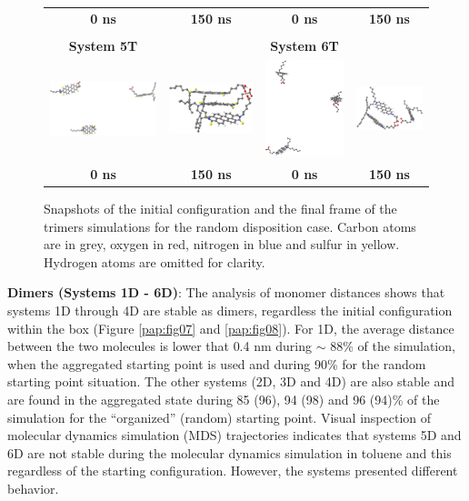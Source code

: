 \begin{figure}[htb]
\begin{tabular}{cccc}
		\small\textbf{0 ns} & \small\textbf{150 ns} & \small\textbf{0 ns} & \small\textbf{150 ns} \\
		&&&\\
		\small\textbf{System 5T} &  & \small\textbf{System 6T} &\\
		\includegraphics[width=0.2\columnwidth]{image/T_M5_0ns} & \includegraphics[width=0.2\columnwidth]{image/T_M5_150ns} &
		\includegraphics[width=0.2\columnwidth]{image/T_M6_0ns} & \includegraphics[width=0.2\columnwidth]{image/T_M6_150ns}\\
		\small\textbf{0 ns} & \small\textbf{150 ns} & \small\textbf{0 ns} & \small\textbf{150 ns} \\
	\end{tabular}
	\caption{Snapshots of the initial configuration and the final frame of the trimers simulations for the random disposition case. Carbon atoms are in grey, oxygen in red, nitrogen in blue and sulfur in yellow. Hydrogen atoms are omitted for clarity.}
	\label{pap:fig06}
\end{figure}

\textbf{Dimers (Systems 1D - 6D)}: The analysis of monomer distances shows that systems 1D through 4D are stable as dimers, regardless the initial configuration within the box (Figure \ref{pap:fig07} and \ref{pap:fig08}). For 1D, the average distance between the two molecules is lower that 0.4 nm during $\sim$ 88\% of the simulation, when the aggregated starting point is used and during 90\% for the random starting point situation. The other systems (2D, 3D and 4D) are also stable and are found in the aggregated state during 85 (96), 94 (98) and 96 (94)\% of the simulation for the ``organized'' (random) starting point. Visual inspection of molecular dynamics simulation (MDS) trajectories indicates that systems 5D and 6D are not stable during the molecular dynamics simulation in toluene and this regardless of the starting configuration. However, the systems presented different behavior. 

